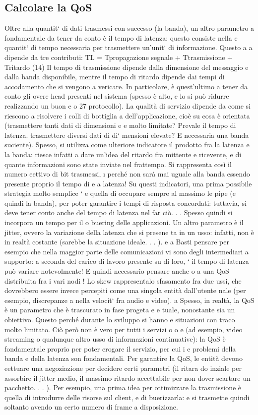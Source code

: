\subsection{Calcolare la QoS}
Oltre alla quantit` di dati trasmessi con successo (la banda), un altro parametro
a
fondamentale da tener da conto è il tempo di latenza: questo consiste nella
e
quantit` di tempo necessaria per trasmettere un'unit` di informazione. Questo
a
a
dipende da tre contributi:
TL = Tpropagazione segnale + Ttrasmissione + Tritardo
(14)
Il tempo di trasmissione dipende dalla dimensione del messaggio e dalla banda
disponibile, mentre il tempo di ritardo dipende dai tempi di accodamento che
si vengono a vericare. In particolare, è quest'ultimo a tener da conto gli overe
head presenti nel sistema (spesso è alto, e lo si può ridurre realizzando un buon
e
o
27
protocollo).
La qualità di servizio dipende da come si riescono a risolvere i colli di bottiglia
a
dell'applicazione, cioè su cosa è orientata (trasmettere tanti dati di dimensioni
e
e
molto limitate? Prevale il tempo di latenza. trasmettere diversi dati di di`
mensioni elevate? E necessaria una banda suciente). Spesso, si utilizza come
ulteriore indicatore il prodotto fra la latenza e la banda: riesce infatti a dare
un'idea del ritardo fra mittente e ricevente, e di quante informazioni sono state
inviate nel frattempo. Si rappresenta così il numero eettivo di bit trasmessi,
\i{}
perché non sarà mai uguale alla banda essendo presente proprio il tempo di
e
a
latenza! Su questi indicatori, una prima possibile strategia molto semplice `
e
quella di occupare sempre al massimo le pipe (e quindi la banda), per poter
garantire i tempi di risposta concordati: tuttavia, si deve tener conto anche
del tempo di latenza nel far ciò. . . Spesso quindi si incorpora un tempo per il
o
buering delle applicazioni.
Un altro parametro è il jitter, ovvero la variazione della latenza che si presene
ta in un usso: infatti, non è in realtà costante (sarebbe la situazione ideale. . . ).
e
a
Basti pensare per esempio che nella maggior parte delle comunicazioni vi sono
degli intermediari a supporto: a seconda del carico di lavoro presente su di loro,
`
il tempo di latenza può variare notevolmente! E quindi necessario pensare anche
o
a una QoS distribuita fra i vari nodi !
Lo skew rappresentalo sfasamento fra due ussi, che dovrebbero essere invece
percepiti come una singola entità dall'utente nale (per esempio, discrepanze
a
nella velocit` fra audio e video).
a
Spesso, in realtà, la QoS è un parametro che è trascurato in fase progeta
e
e
tuale, nonostante sia un obiettivo. Questo perché durante lo sviluppo si hanno
e
situazioni con traco molto limitato. Ciò però non è vero per tutti i servizi
o
o
e
(ad esempio, video streaming o qualunque altro usso di informazioni continuative): la QoS è fondamentale proprio per
poter erogare il servizio, per cui i
e
problemi della banda e della latenza son fondamentali. Per garantire la QoS, le
entità devono eettuare una negoziazione per decidere certi parametri (il ritara
do inziale per assorbire il jitter medio, il massimo ritardo accettabile per non
dover scartare un pacchetto. . . ). Per esempio, una prima idea per ottimizzare
la trasmissione è quella di introdurre delle risorse sul client, e di buerizzarla:
e
si trasmette quindi soltanto avendo un certo numero di frame a disposizione.
